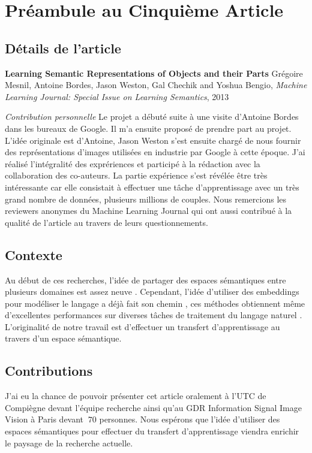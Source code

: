 \chapter{Pr\'{e}ambule au Cinqui\`{e}me Article }

\section{D\'{e}tails de l'article}

{\bf Learning Semantic Representations of Objects and their Parts} Grégoire
Mesnil, Antoine Bordes, Jason Weston, Gal Chechik and Yoshua Bengio, {\it
Machine Learning Journal: Special Issue on Learning Semantics}, 2013

{\it Contribution personnelle} Le projet a débuté suite à une visite d'Antoine
Bordes dans les bureaux de Google. Il m'a ensuite proposé de prendre part au
projet. L'idée originale est d'Antoine, Jason Weston s'est ensuite chargé de
nous fournir des représentations d'images utilisées en industrie par Google à
cette époque. J'ai réalisé l'intégralité des exprériences et participé à la
rédaction avec la collaboration des co-auteurs. La partie expérience s'est
révélée être très intéressante car elle consistait à effectuer une tâche
d'apprentissage avec un très grand nombre de données, plusieurs millions de
couples.  Nous remercions les reviewers anonymes du Machine Learning Journal
qui ont aussi contribué à la qualité de l'article au travers de leurs
questionnements.

\section{Contexte}

Au début de ces recherches, l'idée de partager des espaces sémantiques entre
plusieurs domaines est assez neuve \citep{image-wsabie}. Cependant, l'idée
d'utiliser des embeddings pour modéliser le langage a déjà fait son chemin
\citep{bengio:2003}, ces méthodes obtiennent même d'excellentes performances
sur diverses tâches de traitement du langage naturel \citep{collobert:2011b}.
L'originalité de notre travail est d'effectuer un transfert d'apprentissage au
travers d'un espace sémantique.

\section{Contributions}

J'ai eu la chance de pouvoir présenter cet article oralement à l'UTC de
Compiègne devant l'équipe recherche ainsi qu'au GDR Information Signal Image
Vision à Paris devant $~70$ personnes. Nous espérons que l'idée d'utiliser des
espaces sémantiques pour effectuer du transfert d'apprentissage viendra
enrichir le paysage de la recherche actuelle.

